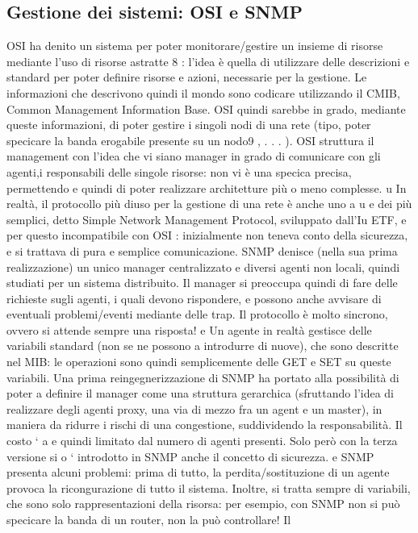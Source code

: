\documentclass[a4paper,12pt]{article}
\begin{document}
\subsection{Gestione dei sistemi: OSI e SNMP}
OSI ha denito un sistema per poter monitorare/gestire un insieme di risorse
mediante l'uso di risorse astratte 8 : l'idea è quella di utilizzare delle descrizioni
e
standard per poter definire risorse e azioni, necessarie per la gestione. Le informazioni che descrivono quindi il mondo
sono codicare utilizzando il CMIB,
Common Management Information Base. OSI quindi sarebbe in grado, mediante queste informazioni, di poter gestire i
singoli nodi di una rete (tipo, poter
specicare la banda erogabile presente su un nodo9 , . . . ). OSI struttura il management con l'idea che vi siano manager
in grado di comunicare con gli agenti,i
responsabili delle singole risorse: non vi è una specica precisa, permettendo
e
quindi di poter realizzare architetture più o meno complesse.
u
In realtà, il protocollo più diuso per la gestione di una rete è anche uno
a
u
e
dei più semplici, detto Simple Network Management Protocol, sviluppato dall'Iu
ETF, e per questo incompatibile con OSI : inizialmente non teneva conto della
sicurezza, e si trattava di pura e semplice comunicazione.
SNMP denisce (nella sua prima realizzazione) un unico manager centralizzato e diversi agenti non locali, quindi studiati
per un sistema distribuito. Il
manager si preoccupa quindi di fare delle richieste sugli agenti, i quali devono
rispondere, e possono anche avvisare di eventuali problemi/eventi mediante delle
trap. Il protocollo è molto sincrono, ovvero si attende sempre una risposta!
e
Un agente in realtà gestisce delle variabili standard (non se ne possono
a
introdurre di nuove), che sono descritte nel MIB: le operazioni sono quindi
semplicemente delle GET e SET su queste variabili.
Una prima reingegnerizzazione di SNMP ha portato alla possibilità di poter
a
definire il manager come una struttura gerarchica (sfruttando l'idea di realizzare
degli agenti proxy, una via di mezzo fra un agent e un master), in maniera da
ridurre i rischi di una congestione, suddividendo la responsabilità. Il costo `
a
e
quindi limitato dal numero di agenti presenti. Solo però con la terza versione si
o
` introdotto in SNMP anche il concetto di sicurezza.
e
SNMP presenta alcuni problemi: prima di tutto, la perdita/sostituzione di
un agente provoca la ricongurazione di tutto il sistema. Inoltre, si tratta sempre di variabili, che sono solo
rappresentazioni della risorsa: per esempio, con
SNMP non si può specicare la banda di un router, non la può controllare! Il
\end{document}
